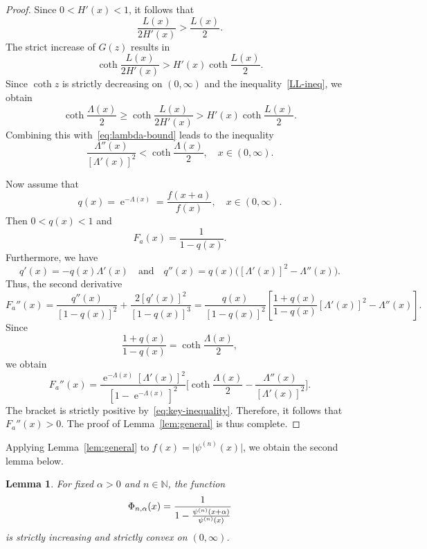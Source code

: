 \documentclass[reqno]{amsart}%
\theoremstyle{plain}
\newtheorem{lem}{Lemma}
\theoremstyle{remark}
\DeclareMathOperator{\te}{e}
\begin{document}
\begin{proof}
Since $0<H'(x)<1$, it follows that
$$
\frac{L(x)}{2H'(x)}>\frac{L(x)}{2}.
$$
The strict increase of $G(z)$ results in
$$
\coth\frac{L(x)}{2H'(x)}>H'(x)\coth\frac{L(x)}{2}.
$$
Since $\coth z$ is strictly decreasing on $(0,\infty)$ and the inequality~\eqref{LL-ineq}, we obtain
$$
\coth\frac{\Lambda(x)}{2}
\geq
\coth\frac{L(x)}{2H'(x)}
>
H'(x)\coth\frac{L(x)}{2}.
$$
Combining this with~\eqref{eq:lambda-bound} leads to the inequality
\begin{equation}\label{eq:key-inequality}
\frac{\Lambda''(x)}{[\Lambda'(x)]^2}<\coth\frac{\Lambda(x)}{2}, \quad x\in(0,\infty).
\end{equation}
\par
Now assume that
$$
q(x)=\te^{-\Lambda(x)}=\frac{f(x+a)}{f(x)}, \quad x\in(0,\infty).
$$
Then $0<q(x)<1$ and
$$
F_a(x)=\frac1{1-q(x)}.
$$
Furthermore, we have
$$
q'(x)=-q(x)\Lambda'(x)\quad\text{and}\quad
q''(x)=q(x)\bigl([\Lambda'(x)]^2-\Lambda''(x)\bigr).
$$
Thus, the second derivative
$$
F_a''(x)=\frac{q''(x)}{[1-q(x)]^2}+\frac{2[q'(x)]^2}{[1-q(x)]^3}
=
\frac{q(x)}{[1-q(x)]^2}
\left[
\frac{1+q(x)}{1-q(x)}[\Lambda'(x)]^2-\Lambda''(x)
\right].
$$
Since
$$
\frac{1+q(x)}{1-q(x)}
=
\coth\frac{\Lambda(x)}{2},
$$
we obtain
$$
F_a''(x)
=
\frac{\te^{-\Lambda(x)}[\Lambda'(x)]^2}{[1-\te^{-\Lambda(x)}]^2}
\biggl[\coth\frac{\Lambda(x)}{2}-\frac{\Lambda''(x)}{[\Lambda'(x)]^2}\biggr].
$$
The bracket is strictly positive by~\eqref{eq:key-inequality}.
Therefore, it follows that $F_a''(x)>0$. The proof of Lemma~\ref{lem:general} is thus complete.
\end{proof}

Applying Lemma~\ref{lem:general} to $f(x)=\bigl|\psi^{(n)}(x)\bigr|$, we obtain the second lemma below.

\begin{lem}\label{OpenProb-convex}
For fixed $\alpha>0$ and $n\in\mathbb{N}$, the function
\begin{equation}\label{Phi_{n-alpha}(x)}
\Phi_{n,\alpha}(x)=\frac{1}{1-\frac{\psi^{(n)}(x+\alpha)}{\psi^{(n)}(x)}}
\end{equation}
is strictly increasing and strictly convex on $(0,\infty)$.
\end{lem}
\end{document}

